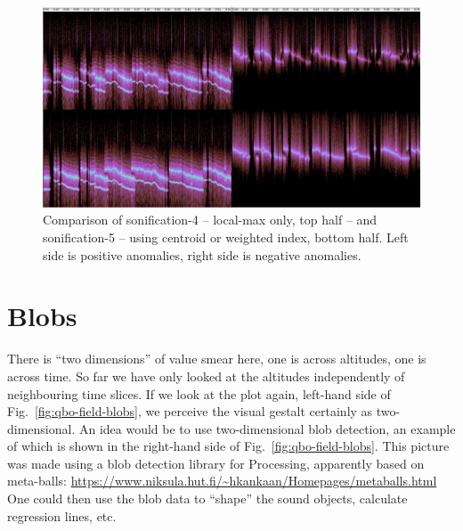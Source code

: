 \documentclass[11pt,a4paper]{article}
\newcommand{\figref}[1]{Fig.~\ref{#1}}
\begin{document}
\begin{figure}
\centering
\includegraphics[width=\textwidth]{figures/sonif4-vs-sonif5.jpg}%
\caption{Comparison of sonification-4 -- local-max only, top half -- and sonification-5 -- using centroid or weighted index, bottom half. Left side is positive anomalies, right side is negative anomalies.}
\label{fig:sonif4-vs-sonif5}
\end{figure}

\section{Blobs}

There is ``two dimensions'' of value smear here, one is across altitudes, one is across time. So far we have only looked at the altitudes independently of neighbouring time slices. If we look at the plot again, left-hand side of \figref{fig:qbo-field-blobs}, we perceive the visual gestalt certainly as two-dimensional. An idea would be to use two-dimensional blob detection, an example of which is shown in the right-hand side of \figref{fig:qbo-field-blobs}. This picture was made using a blob detection library for Processing, apparently based on meta-balls: \url{https://www.niksula.hut.fi/~hkankaan/Homepages/metaballs.html} One could then use the blob data to ``shape'' the sound objects, calculate regression lines, etc.
\end{document}
